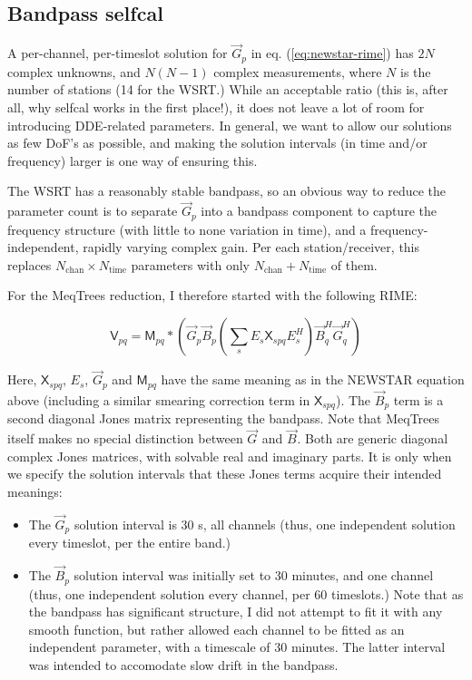 \documentclass[]{aa}
\newcommand{\herm}{H}
\newcommand{\jones}[2]{\vec {#1}_{#2}}
\newcommand{\jonesT}[2]{\vec {#1}^{\herm}_{#2}}
\newcommand{\coh}[2]{\mathsf{{#1}}_{{#2}}}
\begin{document}
\subsection{Bandpass selfcal}

A per-channel, per-timeslot solution for $\jones{G}{p}$ in eq. (\ref{eq:newstar-rime}) has $2N$ complex unknowns, and $N(N-1)$ complex measurements, where $N$ is the number of stations (14 for the WSRT.) While an acceptable ratio (this is, after all, why selfcal works in the first place!), it does not leave a lot of room for introducing DDE-related parameters. In general, we want to allow our solutions as few DoF's as possible, and making the solution intervals (in time and/or frequency) larger is one way of ensuring this.

The WSRT has a reasonably stable bandpass, so an obvious way to reduce the parameter count is to separate $\jones{G}{p}$ into a bandpass component to capture the frequency structure (with little to none variation in time), and a frequency-independent, rapidly varying complex gain. Per each station/receiver, this replaces $N_\mathrm{chan}\times N_\mathrm{time}$ parameters with only $N_\mathrm{chan}+N_\mathrm{time}$ of them.

For the MeqTrees reduction, I therefore started with the following RIME:

\begin{equation}\label{eq:3C147:bandpass}
\coh{V}{pq} = \coh{M}{pq} \ast \left ( \jones{G}{p} \jones{B}{p} \left( \sum_s E_s \coh{X}{spq} E^{\herm}_s \right)  \jonesT{B}{q} \jonesT{G}{q} \right )
\end{equation}

Here, $\coh{X}{spq}$, $E_s$, $\jones{G}{p}$ and $\coh{M}{pq}$ have the same meaning as in the NEWSTAR equation above (including a similar smearing correction term in $\coh{X}{spq}$). The $\jones{B}{p}$ term is a second diagonal Jones matrix representing the bandpass. Note that MeqTrees itself makes no special distinction between $\jones{G}{}$ and $\jones{B}{}$. Both are generic diagonal complex Jones matrices, with solvable real and imaginary parts. It is only when we specify the solution intervals that these Jones terms acquire their intended meanings:

\begin{itemize}
\item The $\jones{G}{p}$ solution interval is 30 s, all channels (thus, one independent solution every timeslot, per the entire band.)
\item The $\jones{B}{p}$ solution interval was initially set to 30 minutes, and one channel (thus, one independent solution every channel, per 60 timeslots.) Note that as the bandpass has significant structure, I did not attempt to fit it with any smooth function, but rather allowed each channel to be fitted as an independent parameter, with a timescale of 30 minutes. The latter interval was intended to accomodate slow drift in the bandpass.
\end{itemize}
\end{document}
